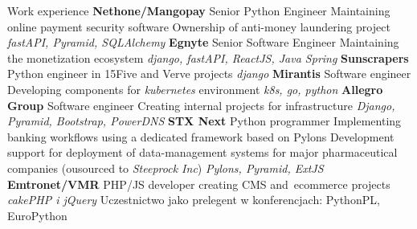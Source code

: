 \begin{rubric}{Work experience}
\entry*[IX 2023 -- X 2024]\textbf{Nethone/Mangopay}\newline
    Senior Python Engineer\newline
    Maintaining online payment security software\newline
    Ownership of anti-money laundering project\newline
    \textit{fastAPI, Pyramid, SQLAlchemy}
\entry*[X 2019 -- VIII 2023]\textbf{Egnyte}\newline
    Senior Software Engineer\newline
    Maintaining the monetization ecosystem\newline
    \textit{django, fastAPI, ReactJS, Java Spring}
\entry*[Feb 2017 -- IX 2019]\textbf{Sunscrapers}\newline
    Python engineer in 15Five and Verve projects\newline
    \textit{django}
\textbf{Mirantis}\newline
    Software engineer\newline
    Developing components for \textit{kubernetes} environment\newline
    \textit{k8s, go, python}
\textbf{Allegro Group}\newline
    Software engineer\newline
    Creating internal projects for infrastructure\newline
    \textit{Django, Pyramid, Bootstrap, PowerDNS}
\textbf{STX Next}\newline
    Python programmer\newline
    Implementing banking workflows using a dedicated framework based on Pylons
    Development support for deployment of data-management systems for major
    pharmaceutical companies (ousourced to \textit{Steeprock Inc})
    \textit{Pylons, Pyramid, ExtJS}\newline
\entry*[VI 2009 -- IV 2011]\textbf{Emtronet/VMR}
    PHP/JS developer\newline
    creating CMS and~\hbox{ecommerce} projects\newline
    \textit{cakePHP i jQuery}
\entry*[inne]Uczestnictwo jako prelegent w konferencjach:\newline
    PythonPL, EuroPython
\end{rubric}
